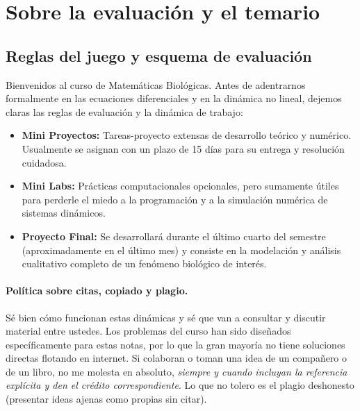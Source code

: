\section{Sobre la evaluación y el temario}

\subsection{Reglas del juego y esquema de evaluación}

Bienvenidos al curso de Matemáticas Biológicas. Antes de adentrarnos formalmente en las ecuaciones diferenciales y en la dinámica no lineal, dejemos claras las reglas de evaluación y la dinámica de trabajo:

\begin{itemize}
    \item \textbf{Mini Proyectos:} Tareas-proyecto extensas de desarrollo teórico y numérico. Usualmente se asignan con un plazo de 15 días para su entrega y resolución cuidadosa.
    \item \textbf{Mini Labs:} Prácticas computacionales opcionales, pero sumamente útiles para perderle el miedo a la programación y a la simulación numérica de sistemas dinámicos.
    \item \textbf{Proyecto Final:} Se desarrollará durante el último cuarto del semestre (aproximadamente en el último mes) y consiste en la modelación y análisis cualitativo completo de un fenómeno biológico de interés.
\end{itemize}

\paragraph{Política sobre citas, copiado y plagio.}
Sé bien cómo funcionan estas dinámicas y sé que van a consultar y discutir material entre ustedes. Los problemas del curso han sido diseñados específicamente para estas notas, por lo que la gran mayoría no tiene soluciones directas flotando en internet. Si colaboran o toman una idea de un compañero o de un libro, no me molesta en absoluto, \emph{siempre y cuando incluyan la referencia explícita y den el crédito correspondiente}. Lo que no tolero es el plagio deshonesto (presentar ideas ajenas como propias sin citar).

